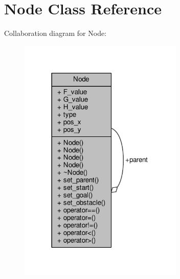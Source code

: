 \hypertarget{class_node}{\section{Node Class Reference}
\label{class_node}
}


Collaboration diagram for Node\+:
\nopagebreak
\begin{figure}[H]
\begin{center}
\leavevmode
\includegraphics[width=222pt]{class_node__coll__graph}
\end{center}
\end{figure}
